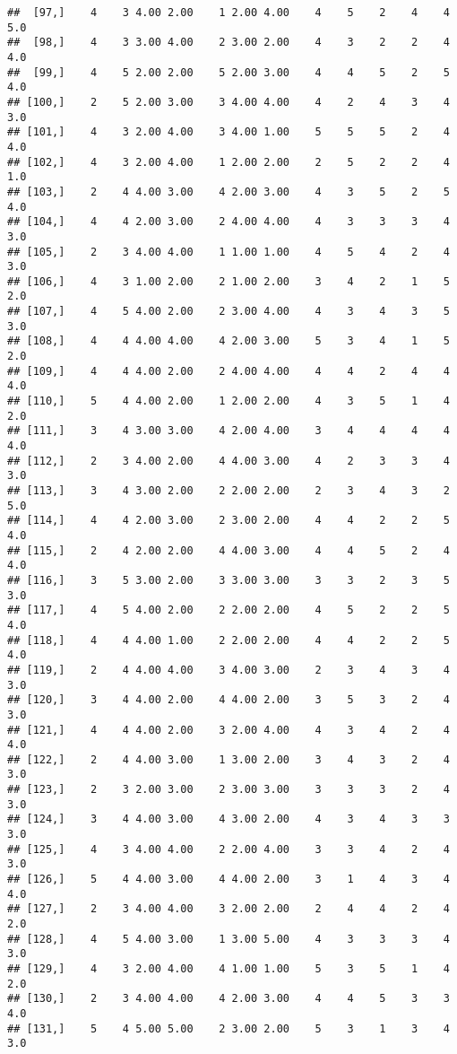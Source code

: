 \documentclass[]{article}
\begin{document}
\begin{verbatim}
##  [97,]    4    3 4.00 2.00    1 2.00 4.00    4    5    2    4    4  5.0
##  [98,]    4    3 3.00 4.00    2 3.00 2.00    4    3    2    2    4  4.0
##  [99,]    4    5 2.00 2.00    5 2.00 3.00    4    4    5    2    5  4.0
## [100,]    2    5 2.00 3.00    3 4.00 4.00    4    2    4    3    4  3.0
## [101,]    4    3 2.00 4.00    3 4.00 1.00    5    5    5    2    4  4.0
## [102,]    4    3 2.00 4.00    1 2.00 2.00    2    5    2    2    4  1.0
## [103,]    2    4 4.00 3.00    4 2.00 3.00    4    3    5    2    5  4.0
## [104,]    4    4 2.00 3.00    2 4.00 4.00    4    3    3    3    4  3.0
## [105,]    2    3 4.00 4.00    1 1.00 1.00    4    5    4    2    4  3.0
## [106,]    4    3 1.00 2.00    2 1.00 2.00    3    4    2    1    5  2.0
## [107,]    4    5 4.00 2.00    2 3.00 4.00    4    3    4    3    5  3.0
## [108,]    4    4 4.00 4.00    4 2.00 3.00    5    3    4    1    5  2.0
## [109,]    4    4 4.00 2.00    2 4.00 4.00    4    4    2    4    4  4.0
## [110,]    5    4 4.00 2.00    1 2.00 2.00    4    3    5    1    4  2.0
## [111,]    3    4 3.00 3.00    4 2.00 4.00    3    4    4    4    4  4.0
## [112,]    2    3 4.00 2.00    4 4.00 3.00    4    2    3    3    4  3.0
## [113,]    3    4 3.00 2.00    2 2.00 2.00    2    3    4    3    2  5.0
## [114,]    4    4 2.00 3.00    2 3.00 2.00    4    4    2    2    5  4.0
## [115,]    2    4 2.00 2.00    4 4.00 3.00    4    4    5    2    4  4.0
## [116,]    3    5 3.00 2.00    3 3.00 3.00    3    3    2    3    5  3.0
## [117,]    4    5 4.00 2.00    2 2.00 2.00    4    5    2    2    5  4.0
## [118,]    4    4 4.00 1.00    2 2.00 2.00    4    4    2    2    5  4.0
## [119,]    2    4 4.00 4.00    3 4.00 3.00    2    3    4    3    4  3.0
## [120,]    3    4 4.00 2.00    4 4.00 2.00    3    5    3    2    4  3.0
## [121,]    4    4 4.00 2.00    3 2.00 4.00    4    3    4    2    4  4.0
## [122,]    2    4 4.00 3.00    1 3.00 2.00    3    4    3    2    4  3.0
## [123,]    2    3 2.00 3.00    2 3.00 3.00    3    3    3    2    4  3.0
## [124,]    3    4 4.00 3.00    4 3.00 2.00    4    3    4    3    3  3.0
## [125,]    4    3 4.00 4.00    2 2.00 4.00    3    3    4    2    4  3.0
## [126,]    5    4 4.00 3.00    4 4.00 2.00    3    1    4    3    4  4.0
## [127,]    2    3 4.00 4.00    3 2.00 2.00    2    4    4    2    4  2.0
## [128,]    4    5 4.00 3.00    1 3.00 5.00    4    3    3    3    4  3.0
## [129,]    4    3 2.00 4.00    4 1.00 1.00    5    3    5    1    4  2.0
## [130,]    2    3 4.00 4.00    4 2.00 3.00    4    4    5    3    3  4.0
## [131,]    5    4 5.00 5.00    2 3.00 2.00    5    3    1    3    4  3.0

\end{verbatim}
\end{document}
